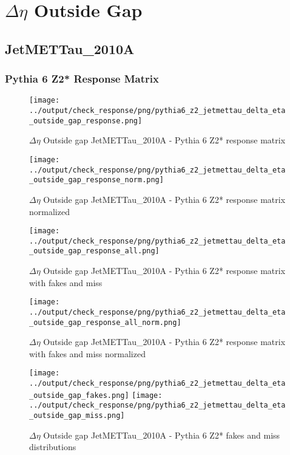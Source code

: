 \documentclass[11pt]{book}
\begin{document}
\newpage
\chapter{$\Delta\eta$ Outside Gap}
\section{JetMETTau\_2010A}
\subsection{Pythia 6 Z2* Response Matrix}

\begin{figure}[ht]
\centering
\texttt{[image: ../output/check\_response/png/pythia6\_z2\_jetmettau\_delta\_eta\_outside\_gap\_response.png]}
\caption{$\Delta\eta$ Outside gap JetMETTau\_2010A - Pythia 6 Z2* response matrix}
\label{p6_jetmettau_delta_eta_outside_gap_response}
\end{figure}

\begin{figure}[ht]
\centering
\texttt{[image: ../output/check\_response/png/pythia6\_z2\_jetmettau\_delta\_eta\_outside\_gap\_response\_norm.png]}
\caption{$\Delta\eta$ Outside gap JetMETTau\_2010A - Pythia 6 Z2* response matrix normalized}
\label{p6_jetmettau_delta_eta_outside_gap_response_norm}
\end{figure}

\begin{figure}[ht]
\centering
\texttt{[image: ../output/check\_response/png/pythia6\_z2\_jetmettau\_delta\_eta\_outside\_gap\_response\_all.png]}
\caption{$\Delta\eta$ Outside gap JetMETTau\_2010A - Pythia 6 Z2* response matrix with fakes and miss}
\label{p6_jetmettau_delta_eta_outside_gap_response_all}
\end{figure}

\begin{figure}[ht]
\centering
\texttt{[image: ../output/check\_response/png/pythia6\_z2\_jetmettau\_delta\_eta\_outside\_gap\_response\_all\_norm.png]}
\caption{$\Delta\eta$ Outside gap JetMETTau\_2010A - Pythia 6 Z2* response matrix with fakes and miss normalized}
\label{p6_jetmettau_delta_eta_outside_gap_response_all_norm}
\end{figure}

\begin{figure}[ht]
\centering
\texttt{[image: ../output/check\_response/png/pythia6\_z2\_jetmettau\_delta\_eta\_outside\_gap\_fakes.png]}
\texttt{[image: ../output/check\_response/png/pythia6\_z2\_jetmettau\_delta\_eta\_outside\_gap\_miss.png]}
\caption{$\Delta\eta$ Outside gap JetMETTau\_2010A - Pythia 6 Z2* fakes and miss distributions}
\label{p6_jetmettau_delta_eta_outside_gap_fakesmiss}
\end{figure}
\end{document}
